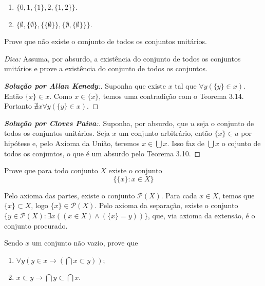 \begin{enumerate}[label=(\alph{*})]
	\item $\{0,1,\{1\},2,\{1,2\}\}$.
	\item $\{\emptyset,\{\emptyset\},\{\{\emptyset\}\},\{\emptyset,\{\emptyset\}\}\}$.
\end{enumerate}


\begin{exercicio}
	Prove que não existe o conjunto de todos os conjuntos unitários.
	
	\emph{Dica:} Assuma, por absurdo, a existência do conjunto de todos os conjuntos unitários e prove a existência do conjunto de todos os conjuntos.
\end{exercicio}

\begin{proof}[\textbf{Solução por Allan Kenedy}:]
	Suponha que existe $x$ tal que $\forall y(\{y\}\in x)$. Então $\{x\}\in x$. Como $x\in\{x\}$, temos uma contradição com o Teorema 3.14. Portanto $\nexists x\forall y(\{y\}\in x)$.
\end{proof}
	
\begin{proof}[\textbf{Solução por Cloves Paiva}:]
	Suponha, por absurdo, que $u$ seja o conjunto de todos os conjuntos unitários. Seja $x$ um conjunto arbitrário, então $\{x\} \in u$ por hipótese e, pelo Axioma da União, teremos $x \in \bigcup x$. Isso faz de $\bigcup x$ o cojunto de todos os conjuntos, o que é um absurdo pelo Teorema 3.10.
\end{proof}
	

\begin{exercicio}
	Prove que para todo conjunto $X$ existe o conjunto
	$$\{\{x\}:x\in X\}$$
\end{exercicio}
\begin{solucao}
	Pelo axioma das partes, existe o conjunto $\mathcal{P}(X)$. Para cada $x\in X$, temos que $\{x\}\subset X$, logo $\{x\}\in\mathcal{P}(X)$. Pelo axioma da separação, existe o conjunto $\{y\in \mathcal{P}(X):\exists x((x\in X)\wedge(\{x\}=y))\}$, que, via axioma da extensão, é o conjunto procurado.
\end{solucao}

\begin{exercicio}
	Sendo $x$ um conjunto não vazio, prove que
	\begin{enumerate}[label=(\alph{*})]
		\item $\forall y(y\in x\to(\bigcap x\subset y))$;
		\item $x\subset y\to \bigcap y\subset \bigcap x$.
	\end{enumerate}
\end{exercicio}

